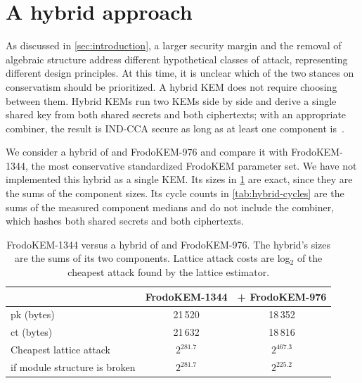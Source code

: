 \section{A hybrid approach}
\label{sec:hybrid}

As discussed in \cref{sec:introduction}, a larger security margin and the removal of
algebraic structure address different hypothetical classes of attack, representing different design principles. At this time, it is unclear which
of the two stances on conservatism should be prioritized. A hybrid KEM does not require choosing between them. Hybrid KEMs run two KEMs side by side and
derive a single shared key from both shared secrets and both ciphertexts; with an appropriate combiner, the result is IND-CCA secure as long as at
least one component is~\cite{PKC:GiaHeuPoe18,PQCRYPTO:BBFGS19}.

We consider a hybrid of  and FrodoKEM-976 and compare it with FrodoKEM-1344, the most conservative standardized FrodoKEM parameter set. We
have not implemented this hybrid as a single KEM. Its sizes in \cref{tab:hybrid} are exact, since they are the sums of the component sizes. Its cycle
counts in \cref{tab:hybrid-cycles} are the sums of the measured component medians and do not
include the combiner, which hashes both shared secrets and both ciphertexts.

\begin{table}[t]
  \centering
  \caption{FrodoKEM-1344 versus a hybrid of  and FrodoKEM-976.
  The hybrid's sizes are the sums of its two components. Lattice attack costs
  are log$_2$ of the cheapest attack found by the lattice estimator.}
  \label{tab:hybrid}
  \begin{tabular}{lcc}
    \toprule
    & FrodoKEM-1344 & \kaiburr-1792 + FrodoKEM-976 \\
    \midrule
    pk (bytes) & 21\,520 & 18\,352 \\
    ct (bytes) & 21\,632 & 18\,816 \\
    Cheapest lattice attack & $2^{281.7}$ & $2^{467.3}$ \\
    \quad if module structure is broken & $2^{281.7}$ & $2^{225.2}$ \\
    \bottomrule
  \end{tabular}
\end{table}

